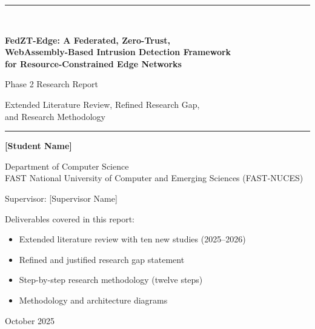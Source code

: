 \documentclass[11pt,a4paper]{article}
\begin{document}
\thispagestyle{empty}
\begin{center}
\vspace*{2.2cm}
{\color{accent}\rule{\textwidth}{1.2pt}}\\[10pt]
{\LARGE\bfseries FedZT-Edge: A Federated, Zero-Trust,\\[4pt]
WebAssembly-Based Intrusion Detection Framework\\[4pt]
for Resource-Constrained Edge Networks\par}
\vspace{10pt}
{\Large Phase 2 Research Report\par}
\vspace{6pt}
{\large Extended Literature Review, Refined Research Gap,\\
and Research Methodology\par}
\vspace{10pt}
{\color{accent}\rule{\textwidth}{1.2pt}}
\vspace{1.6cm}

{\large\bfseries [Student Name]\par}
\vspace{4pt}
{\normalsize Department of Computer Science\\
FAST National University of Computer and Emerging Sciences (FAST-NUCES)\par}
\vspace{4pt}
{\normalsize Supervisor: [Supervisor Name]\par}
\vspace{1.5cm}

{\normalsize Deliverables covered in this report:\par}
\begin{itemize}[leftmargin=2.2em,itemsep=2pt]
  \item[\textbf{D1}] Extended literature review with ten new studies (2025--2026)
  \item[\textbf{D2}] Refined and justified research gap statement
  \item[\textbf{D3}] Step-by-step research methodology (twelve steps)
  \item[\textbf{D4}] Methodology and architecture diagrams
\end{itemize}
\vfill
{\normalsize October 2025\par}
\vspace{0.8cm}
\end{center}
\newpage
\end{document}
